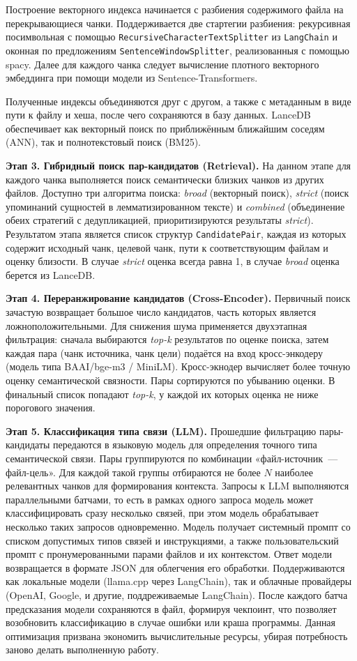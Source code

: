 Построение векторного индекса начинается с разбиения содержимого файла на перекрывающиеся
чанки. Поддерживается две стартегии разбиения: рекурсивная посимвольная с помощью \texttt{RecursiveCharacterTextSplitter}
из \texttt{LangChain} и оконная по предложениям \texttt{SentenceWindowSplitter}, реализованныя с помощью spacy.
Далее для каждого чанка следует вычисление плотного векторного эмбеддинга при помощи модели из Sentence-Transformers.

Полученные индексы объединяются друг с другом, а также с метаданным в виде пути к файлу и хеша,
после чего сохраняются в базу данных.
LanceDB обеспечивает как векторный поиск по приближённым ближайшим соседям (ANN), так и полнотекстовый поиск (BM25).


\textbf{Этап 3. Гибридный поиск пар-кандидатов (Retrieval).}
На данном этапе для каждого чанка выполняется поиск семантически близких чанков из других файлов.
Доступно три алгоритма поиска:
\textit{broad} (векторный поиск),
\textit{strict} (поиск упоминаний сущностей в лемматизированном тексте) и
\textit{combined} (объединение обеих стратегий с дедупликацией, приоритизируются результаты \textit{strict}).
Результатом этапа является список структур \texttt{CandidatePair},
каждая из которых содержит исходный чанк, целевой чанк, пути к соответствующим файлам и оценку близости.
В случае \textit{strict} оценка всегда равна 1, в случае \textit{broad} оценка берется из LanceDB.


\textbf{Этап 4. Переранжирование кандидатов (Cross-Encoder).}
Первичный поиск зачастую возвращает большое число кандидатов, часть которых является ложноположительными.
Для снижения шума применяется двухэтапная фильтрация:
сначала выбираются \textit{top-k} результатов по оценке поиска,
затем каждая пара (чанк источника, чанк цели) подаётся на вход кросс-энкодеру (модель типа BAAI/bge-m3 / MiniLM).
Кросс-экнодер вычисляет более точную оценку семантической связности.
Пары сортируются по убыванию оценки. В финальный список попадают \textit{top-k},
у каждой их которых оценка не ниже порогового значения.

\textbf{Этап 5. Классификация типа связи (LLM).}
Прошедшие фильтрацию пары-кандидаты передаются в языковую модель для определения точного типа семантической связи.
Пары группируются по комбинации «файл-источник~--- файл-цель».
Для каждой такой группы отбираются не более \(N\) наиболее релевантных чанков для формирования контекста.
Запросы к LLM выполняются параллельными батчами, то есть в рамках одного запроса модель может классифицировать сразу несколько связей,
при этом модель обрабатывает несколько таких запросов одновременно.
Модель получает системный промпт со списком допустимых типов связей и инструкциями,
а также пользовательский промпт с пронумерованными парами файлов и их контекстом. Ответ модели возвращается в формате JSON для облегчения его обработки.
Поддерживаются как локальные модели (llama.cpp через LangChain), так и облачные провайдеры (OpenAI, Google, и другие, поддреживаемые LangChain).
После каждого батча предсказания модели сохраняются в файл, формируя чекпоинт, что позволяет возобновить классификацию в случае ошибки или краша программы. 
Данная оптимизация призвана экономить вычислительные ресурсы, убирая потребность заново делать выполненную работу.

